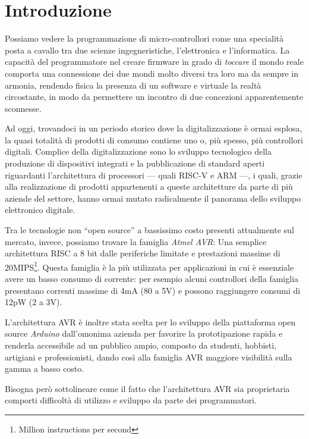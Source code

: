 \chapter{Introduzione}

Possiamo vedere la programmazione di micro-controllori come una specialità posta a cavallo tra due scienze ingegneristiche, l'elettronica e l'informatica.
La capacità del programmatore nel creare firmware in grado di \textit{toccare} il mondo reale comporta una connessione dei due mondi molto diversi tra loro ma da sempre in armonia, rendendo fisica la presenza di un software e virtuale la realtà circostante, in modo da permettere un incontro di due concezioni apparentemente sconnesse.

Ad oggi, trovandoci in un periodo storico dove la digitalizzazione è ormai esplosa, la quasi totalità di prodotti di consumo contiene uno o, più spesso, più controllori digitali.
Complice della digitalizzazione sono lo sviluppo tecnologico della produzione di dispositivi integrati e la pubblicazione di standard aperti riguardanti l'architettura di processori --- quali RISC-V e ARM\cite{site:arm-licensing} ---, i quali, grazie alla realizzazione di prodotti appartenenti a queste architetture da parte di più aziende del settore, hanno ormai mutato radicalmente il panorama dello sviluppo elettronico digitale.\cite{arm-intel-phone-market}\cite{site:arm-press-200b-chips}

Tra le tecnologie non ``open source'' a bassissimo costo presenti attualmente sul mercato, invece, possiamo trovare la famiglia \textit{Atmel AVR}: Una semplice architettura RISC a 8 bit dalle periferiche limitate e prestazioni massime di 20MIPS\footnote{Million instructions per second}.
Questa famiglia è la più utilizzata per applicazioni in cui è essenziale avere un basso consumo di corrente: per esempio alcuni controllori della famiglia presentano correnti massime di 4mA (80 a 5V) e possono raggiungere consumi di 12pW (2 a 3V)\cite{avr:tiny4}.

L'architettura AVR è inoltre stata scelta per lo sviluppo della piattaforma open source \textit{Arduino} dall'omonima azienda per favorire la prototipazione rapida e renderla accessibile ad un pubblico ampio, composto da studenti, hobbisti, artigiani e professionisti\cite{site:arduino-about}, dando così alla famiglia AVR maggiore visibilità sulla gamma a basso costo.

Bisogna però sottolineare come il fatto che l'architettura AVR sia proprietaria comporti difficoltà di utilizzo e sviluppo da parte dei programmatori.

